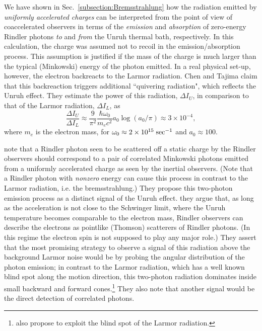 \documentclass[12pt,nofootinbib,floatfix,aps,prd,showpacs,amsmath,amssymb,eqsecnum]{revtex4-2}
\begin{document}
We have shown in Sec.~\ref{subsection:Bremsstrahlung} how the radiation 
emitted by {\em uniformly accelerated charges} can be 
interpreted from the point of view of coaccelerated observers 
in terms of the {\em emission} and {\em absorption} of zero-energy 
Rindler photons {\em to} and {\em from} the Unruh thermal bath, 
respectively. In this calculation, the charge was assumed not to recoil
in the emission/absorption process. This assumption is justified if the
mass of the charge is much larger than the typical (Minkowski) 
energy of the photon
emitted. In a real physical set-up, however, the electron 
backreacts to the Larmor radiation.  Chen and Tajima claim that this
backreaction triggers additional ``quivering radiation", which reflects
the Unruh effect.  They estimate
the power of this radiation, $\Delta I_U$, in comparison to that of the
Larmor radiation, $\Delta I_L$, as 
\begin{equation}
\frac{\Delta I_U}{\Delta I_L}
\approx \frac{9}{\pi^2} \frac{\hbar \omega_0}{m_e c^2} a_0 \log(a_0/\pi)
\approx 3\times 10^{-4},
\end{equation}
where $m_e$ is the electron mass,
for $\omega_0 \approx 2 \times 10^{15}\;{\rm sec}^{-1}$ and $a_0\approx
100$.

\textcite{Schutzholdetal06} note that a Rindler photon seen
to be scattered off a static charge 
by the Rindler observers should correspond to a pair of correlated 
Minkowski photons emitted from a uniformly accelerated charge 
as seen by the inertial observers. (Note that a Rindler photon with
{\em nonzero} energy can cause this process in contrast to the
Larmor radiation, i.e. the bremsstrahlung.)
They propose this two-photon
emission process as a distinct signal of the Unruh effect.
they argue that, 
as long as the acceleration is not close to the Schwinger limit, where
the Unruh temperature becomes comparable to the electron mass, 
Rindler observers can describe the electrons as pointlike (Thomson) 
scatterers of Rindler photons. (In this regime the electron
spin is not supposed to play any major role.) 
They assert that the most promising strategy to observe a signal of
this radiation above the background Larmor noise 
would be by probing the angular distribution of the photon 
emission; in contrast to the Larmor radiation, which has 
a well known blind spot along the motion direction,
this two-photon radiation dominates inside small backward and 
forward 
cones.\footnote{\textcite{Chenetal99} also propose to exploit the blind
spot of the Larmor radiation.}  They also note that 
another signal would be the direct detection 
of correlated photons.
\end{document}
